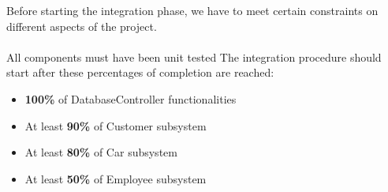 Before starting the integration phase, we have to meet certain constraints on different aspects of the project.
\\\\
All components must have been unit tested
The integration procedure should start after these percentages of completion are reached:
\begin{itemize}
\item \textbf{100\%} of DatabaseController functionalities
\item At least \textbf{90\%} of Customer subsystem
\item At least \textbf{80\%} of Car subsystem
\item At least \textbf{50\%} of Employee subsystem
\end{itemize}
